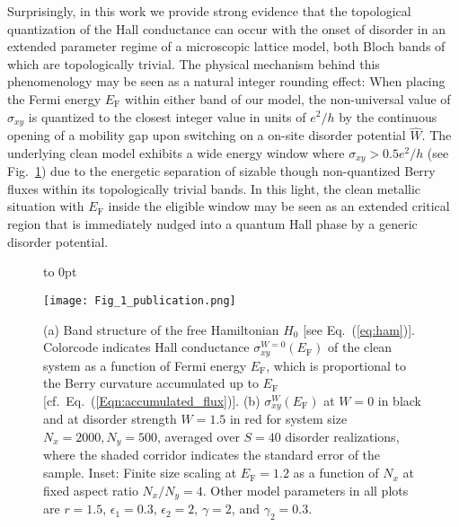 \documentclass[aps,prl,amsmath,amssymb,twocolumn, superscriptaddress]{revtex4-2}
\newcommand{\eq}[1]{Eq.~(\ref{#1})}
\begin{document}
Surprisingly, in this work we provide strong evidence that the topological quantization of the Hall conductance can occur with the onset of disorder in an extended parameter regime of a microscopic lattice model, both Bloch bands of which are topologically trivial. The physical mechanism behind this phenomenology may be seen as a natural integer rounding effect: When placing the Fermi energy $E_\mathrm{F}$ within either band of our model, the non-universal value of $\sigma_{xy}$ is quantized to the closest integer value in units of $e^2/h$ \cite{IQH_Chern_number_2} by the continuous opening of a mobility gap \cite{Anderson_localization, Scaling_theory, Wegner, Wegner, 2D_Anderson_localization, AL_review} upon switching on a on-site disorder potential $\hat W$. The underlying clean model exhibits a wide energy window where $\sigma_{xy} > 0.5 e^2/h$ (see Fig.~\ref{fig:one}) due to the energetic separation of sizable though non-quantized Berry fluxes within its topologically trivial bands. In this light, the clean metallic situation with $E_\mathrm{F}$ inside the eligible window may be seen as an extended critical region that is immediately nudged into a quantum Hall phase by a generic disorder potential.
 
\begin{figure}[htp!]	 
{
    \vbox to 0pt {
            \raggedright
            \textcolor{white}{
            }
        }
}
{\texttt{[image: Fig\_1\_publication.png]}}
\caption{(a) Band structure of the free Hamiltonian $\hat H_0$ [see \eq{eq:ham}]. Colorcode indicates Hall conductance $\sigma_{xy}^{W=0}(E_\mathrm{F})$ of the clean system as a function of Fermi energy $E_\mathrm{F}$, which is proportional to the Berry curvature accumulated up to $E_\mathrm{F}$ [cf.~\eq{Eqn:accumulated_flux}]. (b) $\sigma_{xy}^{W}(E_\mathrm{F})$ at $W = 0$ in black and at disorder strength $W = 1.5$ in red for system size $N_x = 2000, N_y = 500$, averaged over $S=40$ disorder realizations, where the shaded corridor indicates the standard error of the sample. Inset: Finite size scaling at $E_\mathrm{F} = 1.2$ as a function of $N_x$ at fixed aspect ratio $N_x/N_y=4$. Other model parameters in all plots are $r = 1.5$, $\epsilon_1 = 0.3$, $\epsilon_2 = 2$, $\gamma  =2$, and $\gamma_2 = 0.3$.
 }\label{fig:one}
\end{figure}
\end{document}
